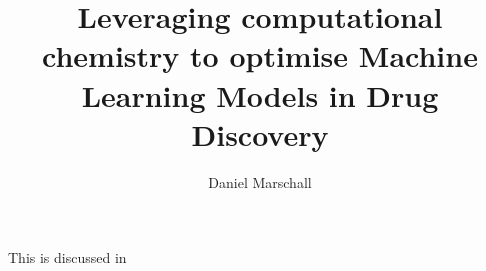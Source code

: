 \documentclass{article}
\begin{document}
\title{Leveraging computational chemistry to optimise Machine Learning Models in Drug Discovery}
\author{Daniel Marschall}
\maketitle

This is discussed in \cite{baptistaEvaluatingMolecularRepresentations}

\printbibliography
\end{document}
